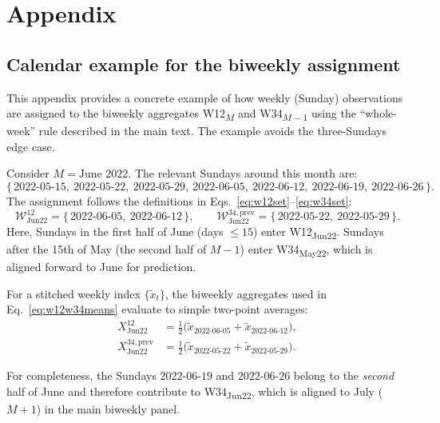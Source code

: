 \documentclass[12pt,a4paper]{article}
\begin{document}
\newpage

\section{Appendix}
\subsection{Calendar example for the biweekly assignment}
\label{app:biweekly-example}

This appendix provides a concrete example of how weekly (Sunday) observations are assigned to the biweekly aggregates W12\textsubscript{$M$} and W34\textsubscript{$M-1$} using the ``whole-week'' rule described in the main text. The example avoids the three-Sundays edge case.

Consider $M=\text{June 2022}$. The relevant Sundays around this month are:
\[
\{\,\text{2022-05-15},\ \text{2022-05-22},\ \text{2022-05-29},\ \text{2022-06-05},\ \text{2022-06-12},\ \text{2022-06-19},\ \text{2022-06-26}\,\}.
\]
The assignment follows the definitions in Eqs.~\eqref{eq:w12set}--\eqref{eq:w34set}:
\[
\mathcal{W}^{12}_{\text{Jun22}}
=
\{\,\text{2022-06-05},\ \text{2022-06-12}\,\},
\qquad
\mathcal{W}^{34,\text{prev}}_{\text{Jun22}}
=
\{\,\text{2022-05-22},\ \text{2022-05-29}\,\}.
\]
Here, Sundays in the first half of June (days $\le 15$) enter W12\textsubscript{Jun22}. Sundays after the 15th of May (the second half of $M{-}1$) enter W34\textsubscript{May22}, which is aligned forward to June for prediction.

For a stitched weekly index $\{\tilde{x}_{t}\}$, the biweekly aggregates used in Eq.~\eqref{eq:w12w34means} evaluate to simple two-point averages:
\begin{align*}
X^{12}_{\text{Jun22}}
&=
\frac{1}{2}\Big(\tilde{x}_{\text{2022-06-05}}+\tilde{x}_{\text{2022-06-12}}\Big),\\
X^{34,\text{prev}}_{\text{Jun22}}
&=
\frac{1}{2}\Big(\tilde{x}_{\text{2022-05-22}}+\tilde{x}_{\text{2022-05-29}}\Big).
\end{align*}

\noindent
For completeness, the Sundays $\text{2022-06-19}$ and $\text{2022-06-26}$ belong to the \emph{second} half of June and therefore contribute to W34\textsubscript{Jun22}, which is aligned to July ($M{+}1$) in the main biweekly panel.

\newpage
\end{document}
